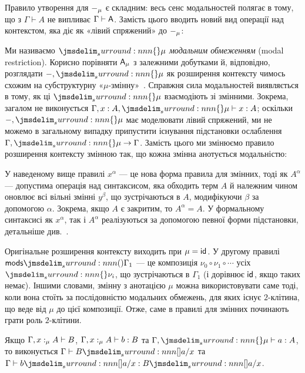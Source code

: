 \documentclass[12pt]{article}
\newcommand{\textcite}{\cite}
\newcommand{\parencite}{\cite}
\let\prn\DelimPrn
\let\brc\DelimBrc
\begin{document}
Правило утворення для $\Modify[\mu]{-}$ є складним: весь сенс модальностей полягає в тому, що з $\Gamma \vdash A$ не випливає $\Gamma \vdash \Modify{A}$. Замість цього \MTT{} вводить новий вид операції над контекстом, яка діє як «лівий спряжений» до $\Modify[\mu]{-}$:
Ми називаємо $\brc{\mu}$ \emph{модальним обмеженням} (modal restriction). Корисно порівняти $\Modify[\mu]{A}$ з залежними добутками й, відповідно, розглядати $\LockCxV{-}$ як розширення контексту чимось схожим на субструктурну «$\mu$-змінну»~\parencite{bahr:2017,birkedal:2020}. Справжня сила модальностей виявляється в тому, як ці $\brc{\mu}$ взаємодіють зі змінними. Зокрема, загалом не виконується $\Gamma, x : A, \brc{\mu} \vdash x : A$; оскільки $\LockCxV{-}$ має моделювати лівий спряжений, ми не можемо в загальному випадку припустити існування підстановки ослаблення $\LockCxV{\Gamma} \to \Gamma$. Замість цього ми змінюємо правило розширення контексту змінною так, що кожна змінна анотується модальністю:
У наведеному вище правилі $x^\alpha$ --- це нова форма правила для змінних, тоді як $A^\alpha$ --- допустима операція над синтаксисом, яка обходить терм $A$ й належним чином оновлює всі вільні змінні $y^\beta$, що зустрічаються в $A$, модифікуючи $\beta$ за допомогою $\alpha$. Зокрема, якщо $A$ є закритим, то $A^\alpha = A$. У формальному синтаксисі як $x^\alpha$, так і $A^\alpha$ реалізуються за допомогою певної форми підстановки, детальніше див.~\textcite{gratzer:mtt-journal:2021}.

Оригінальне розширення контексту виходить при $\mu = \ArrId{}$. У другому правилі $\Con{mods}\prn{\Gamma_1}$ --- це композиція $\nu_0 \circ \nu_1 \circ \cdots$ усіх $\brc{\nu_i}$, що зустрічаються в $\Gamma_1$ (і дорівнює $\ArrId{}$, якщо таких немає). Іншими словами, змінну з анотацією $\mu$ можна використовувати саме тоді, коли вона стоїть за послідовністю модальних обмежень, для яких існує $2$-клітина, що веде від $\mu$ до цієї композиції. Отже, саме в правилі для змінних починають грати роль $2$-клітини.
\begin{lem}
  Якщо $\IsTy[\Gamma, \DeclVar{x}{\mu}{A}]{B}$, $\IsTm[\Gamma, \DeclVar{x}{\mu}{A}]{b}{B}$ та $\IsTm[\LockCxV{\Gamma}]{a}{A}$, то виконується $\IsTy{\Sb{B}{a/x}}$ та $\IsTm{\Sb{b}{a/x}}{\Sb{B}{a/x}}$.
\end{lem}
\end{document}
